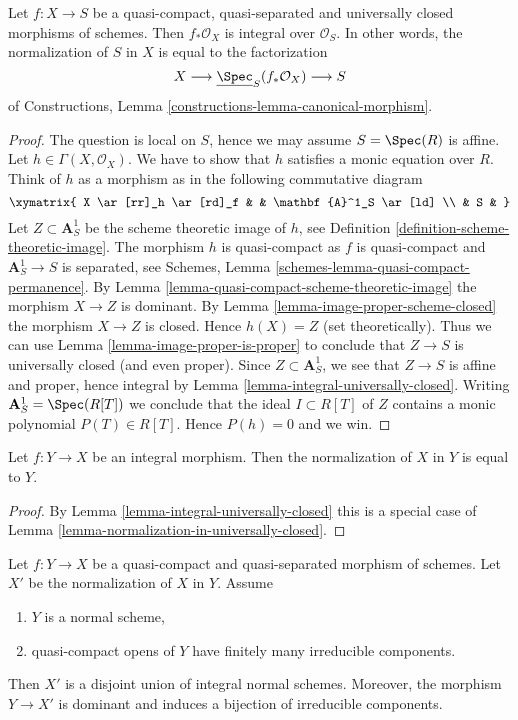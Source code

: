 \begin{lemma}
\label{lemma-normalization-in-universally-closed}
Let $f : X \to S$ be a quasi-compact, quasi-separated and
universally closed morphisms of schemes.
Then $f_*\mathcal{O}_X$ is integral over $\mathcal{O}_S$. In other
words, the normalization of $S$ in $X$ is equal to the factorization
$$
X \longrightarrow \underline{\Spec}_S(f_*\mathcal{O}_X)
\longrightarrow S
$$
of Constructions, Lemma \ref{constructions-lemma-canonical-morphism}.
\end{lemma}

\begin{proof}
The question is local on $S$, hence we may assume $S = \Spec(R)$
is affine. Let $h \in \Gamma(X, \mathcal{O}_X)$. We have to show that
$h$ satisfies a monic equation over $R$. Think of $h$ as a morphism
as in the following commutative diagram
$$
\xymatrix{
X \ar[rr]_h \ar[rd]_f & & \mathbf{A}^1_S \ar[ld] \\
& S &
}
$$
Let $Z \subset \mathbf{A}^1_S$ be the scheme theoretic image of $h$,
see Definition \ref{definition-scheme-theoretic-image}.
The morphism $h$ is quasi-compact as $f$ is quasi-compact and
$\mathbf{A}^1_S \to S$ is separated, see
Schemes, Lemma \ref{schemes-lemma-quasi-compact-permanence}.
By Lemma \ref{lemma-quasi-compact-scheme-theoretic-image} the
morphism $X \to Z$ is dominant. By
Lemma \ref{lemma-image-proper-scheme-closed} the morphism
$X \to Z$ is closed. Hence $h(X) = Z$ (set theoretically).
Thus we can use
Lemma \ref{lemma-image-proper-is-proper}
to conclude that $Z \to S$ is universally closed (and even proper).
Since $Z \subset \mathbf{A}^1_S$, we see that $Z \to S$ is affine
and proper, hence integral by Lemma \ref{lemma-integral-universally-closed}.
Writing $\mathbf{A}^1_S = \Spec(R[T])$ we conclude that
the ideal $I \subset R[T]$ of $Z$ contains a monic polynomial
$P(T) \in R[T]$. Hence $P(h) = 0$ and we win.
\end{proof}

\begin{lemma}
\label{lemma-normalization-in-integral}
Let $f : Y \to X$ be an integral morphism.
Then the normalization of $X$ in $Y$ is equal to $Y$.
\end{lemma}

\begin{proof}
By Lemma \ref{lemma-integral-universally-closed} this is a special case of
Lemma \ref{lemma-normalization-in-universally-closed}.
\end{proof}

\begin{lemma}
\label{lemma-normal-normalization}
Let $f : Y \to X$ be a quasi-compact and quasi-separated morphism
of schemes. Let $X'$ be the normalization of $X$ in $Y$. Assume
\begin{enumerate}
\item $Y$ is a normal scheme,
\item quasi-compact opens of $Y$ have finitely many irreducible components.
\end{enumerate}
Then $X'$ is a disjoint union of integral normal schemes. Moreover,
the morphism $Y \to X'$ is dominant and induces a bijection of
irreducible components.
\end{lemma}

